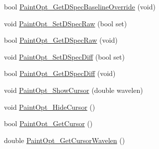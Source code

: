 \begin{DoxyCompactItemize}
\item 
bool \hyperlink{classCSpectrometer_a21dc6cefdada24b14c352365fe304bff}{PaintOpt\_\-GetDSpecBaselineOverride} (void)
\item 
void \hyperlink{classCSpectrometer_a8ce2c697a7539748d5ef2d7d617ac7f3}{PaintOpt\_\-SetDSpecRaw} (bool set)
\item 
bool \hyperlink{classCSpectrometer_aa076873718f1df392ca151f25124c1cd}{PaintOpt\_\-GetDSpecRaw} (void)
\item 
void \hyperlink{classCSpectrometer_a3c240859299d0c355c2e89c644953cf0}{PaintOpt\_\-SetDSpecDiff} (bool set)
\item 
bool \hyperlink{classCSpectrometer_a86c0e470b24a584972deb31ce91c6587}{PaintOpt\_\-GetDSpecDiff} (void)
\item 
void \hyperlink{classCSpectrometer_a15be31d22a30a23c6ecac2454a542318}{PaintOpt\_\-ShowCursor} (double wavelen)
\item 
void \hyperlink{classCSpectrometer_a3307bb315256ba7dc9bc442289856924}{PaintOpt\_\-HideCursor} ()
\item 
bool \hyperlink{classCSpectrometer_a06387841a78d0c8bf26b525e83606a46}{PaintOpt\_\-GetCursor} ()
\item 
double \hyperlink{classCSpectrometer_ae81b1b0607bff8d33f7756b363e99e8a}{PaintOpt\_\-GetCursorWavelen} ()
\end{DoxyCompactItemize}
